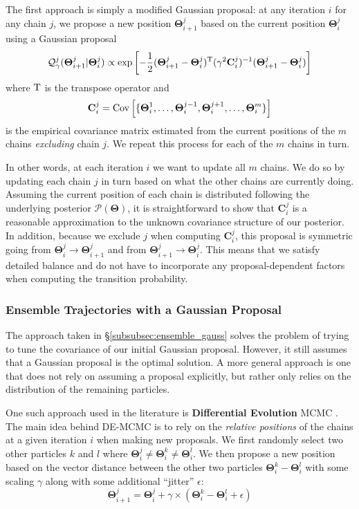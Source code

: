 \documentclass[12pt, titlepage]{article}
\newcommand{\params}{\ensuremath{\boldsymbol\Theta}}
\newcommand{\posterior}{\ensuremath{\mathcal{P}}}
\newcommand{\proposal}{\ensuremath{\mathcal{Q}}}
\newcommand{\cov}{\ensuremath{\mathbf{C}}}
\begin{document}
The first approach is simply a modified
Gaussian proposal: at any iteration $i$ for any chain
$j$, we propose a new position $\params_{i+1}^{j}$
based on the current position $\params_{i}^{j}$
using a Gaussian proposal
\begin{equation}
    \proposal_\gamma^j(\params_{i+1}^{j}|\params_{i}^j)
    \propto \exp\left[-\frac{1}{2}
    (\params_{i+1}^{j} - \params_{i}^{j})^{\rm T}
    (\gamma^2\cov_i^j)^{-1}
    (\params_{i+1}^{j} - \params_{i}^{j})\right]
\end{equation}
where ${\rm T}$ is the transpose operator and
\begin{equation}
    \cov_i^j = {\rm Cov}\left[\{\params_i^1, \dots, 
    \params_i^{j-1}, \params_i^{j+1}, \dots, \params_i^m\}\right]
\end{equation}
is the empirical covariance matrix estimated from the
current positions of the $m$ chains \textit{excluding} chain $j$.
We repeat this process for each of the $m$ chains in turn.

In other words, at each iteration $i$ we want to update all
$m$ chains. We do so by updating each chain $j$ in turn based on what
the other chains are currently doing. Assuming the current position of
each chain is distributed following the underlying posterior
$\posterior(\params)$, it is straightforward to show that
$\cov_i^j$ is a reasonable approximation to the unknown
covariance structure of our posterior. In addition,
because we exclude $j$ when computing $\cov_i^j$, this proposal
is symmetric going from $\params_{i}^{j} \rightarrow \params_{i+1}^{j}$
and from $\params_{i+1}^{j} \rightarrow \params_{i}^{j}$.
This means that we satisfy detailed balance and do not
have to incorporate any proposal-dependent factors when
computing the transition probability.

\subsubsection{Ensemble Trajectories with a Gaussian Proposal} 
\label{subsubsec:demcmc}

The approach taken in \S\ref{subsubsec:ensemble_gauss}
solves the problem of trying to tune
the covariance of our initial Gaussian proposal. However, it still
assumes that a Gaussian proposal is the optimal solution.
A more general approach is one that does not rely on assuming a
proposal explicitly, but rather only relies on the distribution of
the remaining particles. 

One such approach used in the literature is
\textbf{Differential Evolution} MCMC \citep[DE-MCMC;][]{stornprice97,terbraak06}.
The main idea behind DE-MCMC is to rely on the \textit{relative positions}
of the chains at a given iteration $i$ when making new proposals. We first
randomly select two other particles $k$ and $l$ where
$\params^j_i \neq \params^k_i \neq \params^l_i$. We then propose
a new position based on the vector distance between the other
two particles $\params^k_i - \params^l_i$ with some scaling $\gamma$
along with some additional ``jitter'' $\epsilon$:
\begin{equation}
    \params_{i+1}^{j} 
    = \params_i^j + \gamma \times (\params^{k}_i - \params^l_i + \epsilon)
\end{equation}
\end{document}
